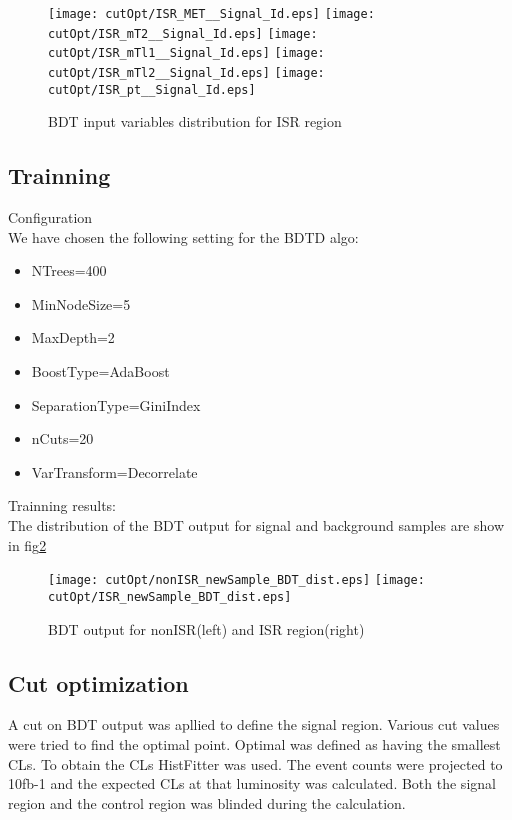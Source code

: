 \begin{figure}
\texttt{[image: cutOpt/ISR\_MET\_\_Signal\_Id.eps]}
\texttt{[image: cutOpt/ISR\_mT2\_\_Signal\_Id.eps]}
\texttt{[image: cutOpt/ISR\_mTl1\_\_Signal\_Id.eps]}
\texttt{[image: cutOpt/ISR\_mTl2\_\_Signal\_Id.eps]}
\texttt{[image: cutOpt/ISR\_pt\_\_Signal\_Id.eps]}
\caption{BDT input variables distribution for ISR region}
\label{fig:BDT_ISR_input2}
\end{figure}

\subsection{Trainning}
Configuration\\
We have chosen the following setting for the BDTD algo:
\begin{itemize}
\item NTrees=400
\item MinNodeSize=5%
\item MaxDepth=2
\item BoostType=AdaBoost
\item SeparationType=GiniIndex
\item nCuts=20
\item VarTransform=Decorrelate
\end{itemize}
Trainning results:\\
The distribution of the BDT output for signal and background samples are show in fig\ref{fig:BDT_output}

\begin{figure}
\texttt{[image: cutOpt/nonISR\_newSample\_BDT\_dist.eps]}
\texttt{[image: cutOpt/ISR\_newSample\_BDT\_dist.eps]}
\caption{BDT output for nonISR(left) and ISR region(right)}
\label{fig:BDT_output}
\end{figure}

\subsection{Cut optimization}
A cut on BDT output was apllied to define the signal region. Various cut values were tried to find the optimal point. Optimal was defined as having the smallest CLs. To obtain the CLs HistFitter was used. The event counts were projected to 10fb-1 and the expected CLs at that luminosity was calculated. Both the signal region and the control region was blinded during the calculation.

